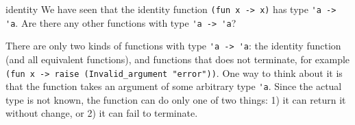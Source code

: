 %
\begin{exercise}{identity}
We have seen that the identity function \hbox{\lstinline/(fun x -> x)/} has type \hbox{\lstinline/'a -> 'a/}.
Are there any other functions with type \hbox{\lstinline/'a -> 'a/}?

\begin{answer}\ifanswers
There are only two kinds of functions with type \hbox{\lstinline/'a -> 'a/}: the identity function (and all
equivalent functions), and functions that does not terminate, for example
%
\hbox{\lstinline/(fun x -> raise (Invalid_argument "error"))/}.  One way to think about it is that the
function takes an argument of some arbitrary type \hbox{\lstinline/'a/}.  Since the actual type is not
known, the function can do only one of two things: 1) it can return it without change, or 2) it can
fail to terminate.
\fi\end{answer}
\end{exercise}

